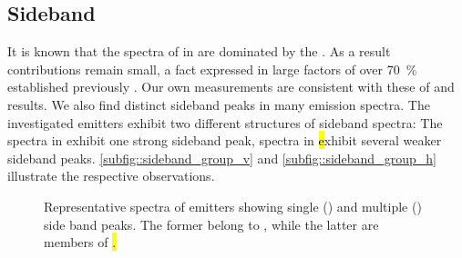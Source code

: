 	\subsection{Sideband} \label{subsubsec::sideband}

		It is known that the \pl spectra of \sivs in \nd are dominated by the \zpl. As a result \psb contributions remain small, a fact expressed in large \db factors of over \SI{70}{\percent} established previously \cite{Neu2011,Neu2011b}. Our own measurements are consistent with these of \emnarrow and \embroad results. We also find distinct sideband peaks in many \siv \pl emission spectra.
		The investigated emitters exhibit two different structures of sideband spectra: The spectra in \vl exhibit one strong sideband peak, spectra in \hl exhibit several weaker sideband peaks. \autoref{subfig::sideband_group_v} and \autoref{subfig::sideband_group_h} illustrate the respective observations.

		\begin{figure}[htp]
			\begin{subfigure}[t]{ 0.49\linewidth}
				\centering
				\caption{}
				\label{subfig::sideband_group_v}
			\end{subfigure}
			\hfill
			\begin{subfigure}[t]{ 0.49\linewidth}
				\centering
				\caption{}
				\label{subfig::sideband_group_h}
			\end{subfigure}
			\caption[Side band peaks for \sivs]{Representative spectra of emitters showing single () and multiple () side band peaks. The former belong to \vl, while the latter are members of \hl.}
			\label{fig::sideband_groups}
		\end{figure}

